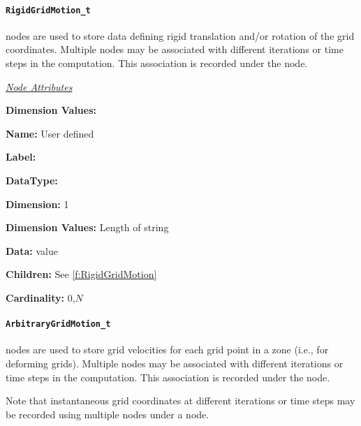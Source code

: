 \paragraph{\texttt{RigidGridMotion\_t}}

 nodes are used to store data
defining rigid translation and/or rotation of the grid coordinates.
Multiple  nodes may be associated with different
iterations or time steps in the computation.
This association is recorded under the  node.

\textit{\uline{Node Attributes}}
\begin{Ventryic}{\textbf{Dimension Values:}}
\item [\textbf{Name:}]
      User defined
\item [\textbf{Label:}]
\item [\textbf{DataType:}]
\item [\textbf{Dimension:}]
      1
\item [\textbf{Dimension Values:}]
      Length of string
\item [\textbf{Data:}]
       value
\item [\textbf{Children:}]
      See \autoref{f:RigidGridMotion}
\item [\textbf{Cardinality:}]
      0,$N$
\end{Ventryic}

\paragraph{\texttt{ArbitraryGridMotion\_t}}

 nodes are used to store grid
velocities for each grid point in a zone (i.e., for deforming grids).
Multiple  nodes may be associated with
different iterations or time steps in the computation.
This association is recorded under the  node.

Note that instantaneous grid coordinates at different iterations or time
steps may be recorded using multiple  nodes
under a  node.

